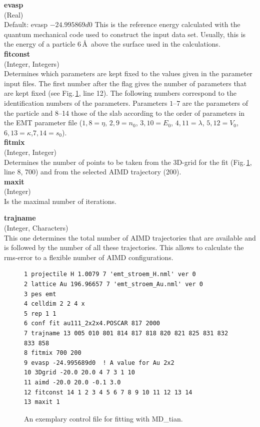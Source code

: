 \documentclass[twoside, 11pt, titlepage, captions=nooneline, a4paper, headsepline]{scrbook}%
\newcommand{\9}{\mathrm}
\newcommand{\0}{\,\mathrm}
\begin{document}
\noindent\textbf{evasp}\\
(Real)\\ 
Default: evasp $-24.995869d0$
This is the reference energy calculated with the quantum mechanical code used to construct the input data set. Usually, this is the energy of a particle 6\,\AA~above the surface used in the calculations.\\

\noindent\textbf{fitconst}\\
(Integer, Integers)\\
Determines which parameters are kept fixed to the values given in the parameter input files. The first number after the flag gives the number of parameters that are kept fixed (see Fig.\,\ref{Fig:mxt:fitting}, line 12). The following numbers correspond to the identification numbers of the parameters. Parameters $1$--$7$ are the parameters of the particle and 8--14 those of the slab according to the order of parameters in the EMT parameter file ($1,8 = \eta$, $2,9 = n_0$, $3,10 = E_0$, $4,11 = \lambda$, $5,12 = V_0$, $6,13 = \kappa$,$7,14 = s_0$).\\

\noindent\textbf{fitmix}\\
(Integer, Integer)\\
Determines the number of points to be taken from the 3D-grid for the fit (Fig.\,\ref{Fig:mxt:fitting}, line 8, 700) and from the selected AIMD trajectory (200).\\

\noindent\textbf{maxit}\\
(Integer)\\
Is the maximal number of iterations.

\noindent\textbf{trajname}\\
(Integer, Characters)\\
This one determines the total number of AIMD trajectories that are available and is followed by the number of all these trajectories. This allows to calculate the rms-error to a flexible number of AIMD configurations.\\


\begin{figure}[t!]
\begin{verbatim}
1 projectile H 1.0079 7 'emt_stroem_H.nml' ver 0
2 lattice Au 196.96657 7 'emt_stroem_Au.nml' ver 0
3 pes emt
4 celldim 2 2 4 x
5 rep 1 1
6 conf fit au111_2x2x4.POSCAR 817 2000
7 trajname 13 005 010 801 814 817 818 820 821 825 831 832 833 858
8 fitmix 700 200
9 evasp -24.995689d0  ! A value for Au 2x2
10 3Dgrid -20.0 20.0 4 7 3 1 10
11 aimd -20.0 20.0 -0.1 3.0
12 fitconst 14 1 2 3 4 5 6 7 8 9 10 11 12 13 14
13 maxit 1 
\end{verbatim}
\caption{\label{Fig:mxt:fitting}An exemplary control file for fitting with MD\_tian.}
\end{figure}
\end{document}

